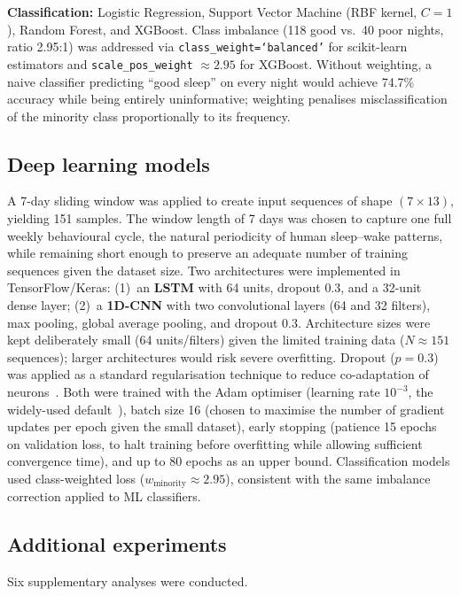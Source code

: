 \documentclass[fleqn,10pt]{wlscirep}
\begin{document}
\noindent\textbf{Classification:} Logistic Regression, Support Vector Machine (RBF kernel, $C = 1$), Random Forest, and XGBoost. Class imbalance (118 good vs.\ 40 poor nights, ratio 2.95:1) was addressed via \texttt{class\_weight=`balanced'} for scikit-learn estimators and \texttt{scale\_pos\_weight} $\approx 2.95$ for XGBoost. Without weighting, a naive classifier predicting ``good sleep'' on every night would achieve 74.7\% accuracy while being entirely uninformative; weighting penalises misclassification of the minority class proportionally to its frequency.

\subsection*{Deep learning models}
A 7-day sliding window was applied to create input sequences of shape $(7 \times 13)$, yielding 151 samples. The window length of 7 days was chosen to capture one full weekly behavioural cycle, the natural periodicity of human sleep--wake patterns, while remaining short enough to preserve an adequate number of training sequences given the dataset size. Two architectures were implemented in TensorFlow/Keras: (1)~an \textbf{LSTM} with 64 units, dropout 0.3, and a 32-unit dense layer; (2)~a \textbf{1D-CNN} with two convolutional layers (64 and 32 filters), max pooling, global average pooling, and dropout 0.3. Architecture sizes were kept deliberately small (64 units/filters) given the limited training data ($N \approx 151$ sequences); larger architectures would risk severe overfitting. Dropout ($p = 0.3$) was applied as a standard regularisation technique to reduce co-adaptation of neurons~\cite{leeTW2023}. Both were trained with the Adam optimiser (learning rate $10^{-3}$, the widely-used default~\cite{lee2025}), batch size 16 (chosen to maximise the number of gradient updates per epoch given the small dataset), early stopping (patience 15 epochs on validation loss, to halt training before overfitting while allowing sufficient convergence time), and up to 80 epochs as an upper bound. Classification models used class-weighted loss ($w_{\mathrm{minority}} \approx 2.95$), consistent with the same imbalance correction applied to ML classifiers.

\subsection*{Additional experiments}
\noindent Six supplementary analyses were conducted.
 
\end{document}
